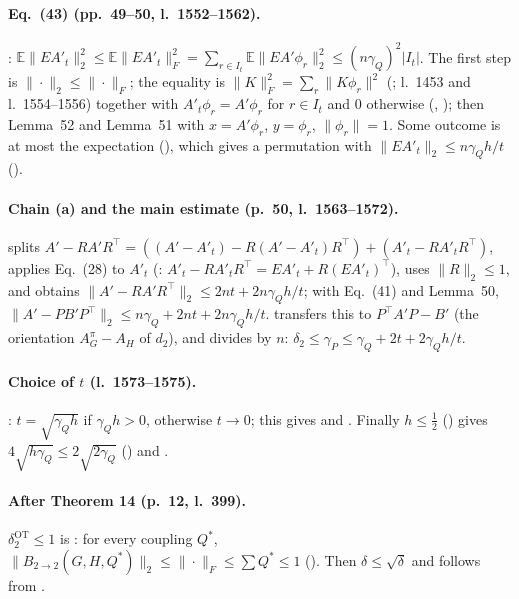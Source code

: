 \paragraph{Eq.~(43) (pp.~49--50, l.~1552--1562).} : $\mathbb E\|EA'_t\|_2^2\le\mathbb E\|EA'_t\|_F^2=
\sum_{r\in I_t}\mathbb E\|EA'\phi_r\|_2^2\le(n\gamma_Q)^2|I_t|$. The first step is $\|\cdot\|_2\le\|\cdot\|_F$; the
equality is $\|K\|_F^2=\sum_r\|K\phi_r\|^2$ (; l.~1453 and l.~1554--1556) together with
$A'_t\phi_r=A'\phi_r$ for $r\in I_t$ and $0$ otherwise (,
); then Lemma~52 and Lemma~51 with $x=A'\phi_r$, $y=\phi_r$, $\|\phi_r\|=1$.
Some outcome is at most the expectation (), which gives a permutation with
$\|EA'_t\|_2\le n\gamma_Qh/t$ ().

\paragraph{Chain (a) and the main estimate (p.~50, l.~1563--1572).}  splits
$A'-RA'R^\top=((A'-A'_t)-R(A'-A'_t)R^\top)+(A'_t-RA'_tR^\top)$, applies Eq.~(28) to $A'_t$ (:
$A'_t-RA'_tR^\top=EA'_t+R(EA'_t)^\top$), uses $\|R\|_2\le1$, and obtains $\|A'-RA'R^\top\|_2\le2nt+2n\gamma_Qh/t$;
with Eq.~(41) and Lemma~50, $\|A'-PB'P^\top\|_2\le n\gamma_Q+2nt+2n\gamma_Qh/t$. 
transfers this to $P^\top A'P-B'$ (the orientation $A^\pi_G-A_H$ of $d_2$), and 
divides by $n$: $\delta_2\le\gamma_P\le\gamma_Q+2t+2\gamma_Qh/t$.

\paragraph{Choice of $t$ (l.~1573--1575).} : $t=\sqrt{\gamma_Qh}$ if $\gamma_Qh>0$,
otherwise $t\to0$; this gives  and . Finally $h\le\frac12$
() gives $4\sqrt{h\gamma_Q}\le2\sqrt{2\gamma_Q}$ () and
.

\paragraph{After Theorem 14 (p.~12, l.~399).} $\delta^{\mathrm{OT}}_2\le1$ is
: for every coupling $Q^*$, $\|B_{2\to2}(G,H,Q^*)\|_2\le\|\cdot\|_F\le\sum Q^*\le1$
(). Then $\delta\le\sqrt\delta$ and  follows from .

